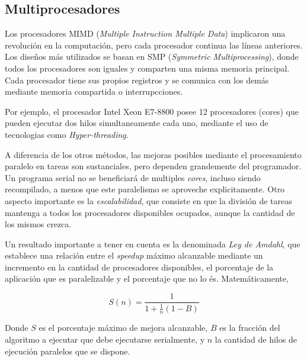\subsection{Multiprocesadores}

Los procesadores MIMD (\textit{Multiple Instruction Multiple Data}) implicaron una revoluci\'on en la computaci\'on, pero
cada procesador continua las l\'ineas anteriores.  Los dise\~nos m\'as utilizados se basan en SMP (\textit{Symmetric
Multiprocessing}), donde todos los procesadores son iguales y comparten una misma memoria principal. Cada procesador tiene
sus propios registros y se comunica con los dem\'as mediante memoria compartida o interrupcciones.

Por ejemplo, el procesador Intel Xeon E7-8800 posee 12 procesadores (cores) que pueden ejecutar dos hilos simultaneamente
cada uno, mediante el uso de tecnologias como \textit{Hyper-threading}.

A diferencia de los otros m\'etodos, las mejoras posibles mediante el procesamiento paralelo en tareas son sustanciales,
pero dependen grandemente del programador. Un programa serial no se beneficiar\'a de multiples \textit{cores},
incluso siendo recompilado, a menos que este paralelismo se aproveche explicitamente. Otro aspecto importante es la
\textit{escalabilidad}, que consiste en que la divisi\'on de tareas mantenga a todos los procesadores disponibles ocupados,
aunque la cantidad de los mismos crezca.

Un resultado importante a tener en cuenta es la denominada \textit{Ley de Amdahl}, que establece una relaci\'on entre
el \textit{speedup} m\'aximo alcanzable mediante un incremento en la cantidad de procesadores disponibles, el porcentaje
de la aplicaci\'on que es paralelizable y el porcentaje que no lo \'es. Matem\'aticamente,

\begin{equation}
    \label{eq:amdahl}
    S(n) = \frac{1}{1 + \frac{1}{n} (1 - B)}
\end{equation}

Donde $S$ es el porcentaje m\'aximo de mejora alcanzable, $B$ es la fracci\'on del algoritmo a ejecutar que debe ejecutarse
serialmente, y $n$ la cantidad de hilos de ejecuci\'on paralelos que se dispone.

